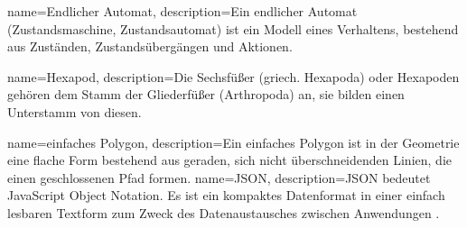 %
%


%
%

%
%
{
  name={Endlicher Automat},
  description={Ein endlicher Automat (Zustandsmaschine, Zustandsautomat) ist ein Modell eines Verhaltens,
    bestehend aus Zuständen, Zustandsübergängen und Aktionen.}
}

{
  name={Hexapod},
  description={Die Sechsfüßer (griech. Hexapoda) oder Hexapoden
    gehören dem Stamm der Gliederfüßer (Arthropoda) an,
    sie bilden einen Unterstamm von diesen.}
}

{
  name={einfaches Polygon},
  description={Ein einfaches Polygon ist in der Geometrie eine flache Form bestehend aus geraden,
    sich nicht überschneidenden Linien, die einen geschlossenen Pfad formen.}
}
{
  name={JSON},
  description={JSON bedeutet JavaScript Object Notation.
  Es ist ein kompaktes Datenformat in einer einfach lesbaren Textform zum Zweck des Datenaustausches zwischen Anwendungen \cite{json}.
  }
}
